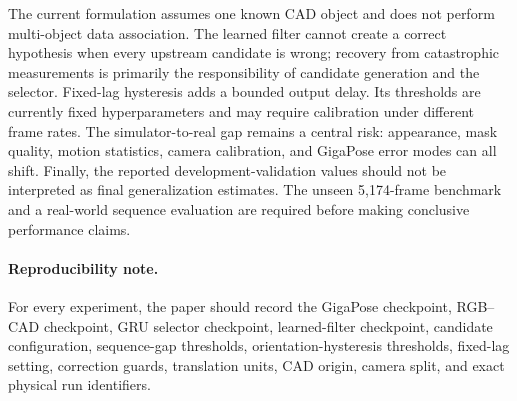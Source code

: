 \documentclass[10pt,twocolumn]{article}
\begin{document}
The current formulation assumes one known CAD object and does not perform
multi-object data association. The learned filter cannot create a correct
hypothesis when every upstream candidate is wrong; recovery from catastrophic
measurements is primarily the responsibility of candidate generation and the
selector. Fixed-lag hysteresis adds a bounded output delay. Its thresholds are
currently fixed hyperparameters and may require calibration under different
frame rates. The simulator-to-real gap remains a central risk: appearance,
mask quality, motion statistics, camera calibration, and GigaPose error modes
can all shift. Finally, the reported development-validation values should not
be interpreted as final generalization estimates. The unseen 5,174-frame
benchmark and a real-world sequence evaluation are required before making
conclusive performance claims.

\paragraph{Reproducibility note.}
For every experiment, the paper should record the GigaPose checkpoint, RGB--CAD
checkpoint, GRU selector checkpoint, learned-filter checkpoint, candidate
configuration, sequence-gap thresholds, orientation-hysteresis thresholds,
fixed-lag setting, correction guards, translation units, CAD origin, camera
split, and exact physical run identifiers.



\end{document}
